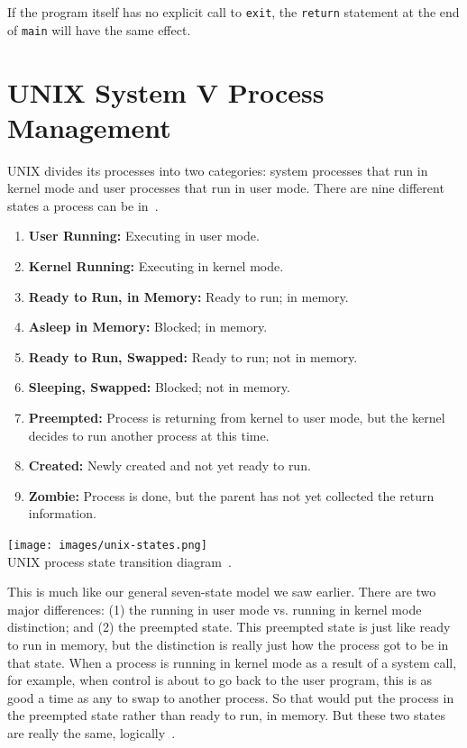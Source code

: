 If the program itself has no explicit call to \texttt{exit}, the \texttt{return} statement at the end of \texttt{main} will have the same effect.

\section*{UNIX System V Process Management}

UNIX divides its processes into two categories: system processes that run in kernel mode and user processes that run in user mode. There are nine different states a process can be in~\cite{osi}.

\begin{enumerate}
	\item \textbf{User Running:} Executing in user mode.
	\item \textbf{Kernel Running:} Executing in kernel mode.
	\item \textbf{Ready to Run, in Memory:} Ready to run; in memory.
	\item \textbf{Asleep in Memory:} Blocked; in memory.
	\item \textbf{Ready to Run, Swapped:} Ready to run; not in memory.
	\item \textbf{Sleeping, Swapped:} Blocked; not in memory.
	\item \textbf{Preempted:} Process is returning from kernel to user mode, but the kernel decides to run another process at this time.
	\item \textbf{Created:} Newly created and not yet ready to run.
	\item \textbf{Zombie:} Process is done, but the parent has not yet collected the return information.
\end{enumerate}


\begin{center}
\texttt{[image: images/unix-states.png]}\\
UNIX process state transition diagram~\cite{osi}.
\end{center}

This is much like our general seven-state model we saw earlier. There are two major differences: (1) the running in user mode vs. running in kernel mode distinction; and (2) the preempted state. This preempted state is just like ready to run in memory, but the distinction is really just how the process got to be in that state. When a process is running in kernel mode as a result of a system call, for example, when control is about to go back to the user program, this is as good a time as any to swap to another process. So that would put the process in the preempted state rather than ready to run, in memory. But these two states are really the same, logically~\cite{osi}. 

